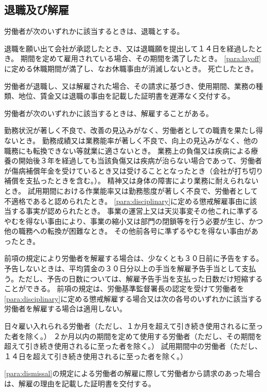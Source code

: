 \documentclass[10pt,a4paper]{jsarticle}
\begin{document}
\subsection{退職及び解雇}

労働者が次のいずれかに該当するときは、退職とする。
\begin{enumerate}
    \itm 退職を願い出て会社が承認したとき、又は退職願を提出して１４日を経過したとき。
    \itm 期間を定めて雇用されている場合、その期間を満了したとき。
    \itm \ref{para:layoff}に定める休職期間が満了し、なお休職事由が消滅しないとき。
    \itm 死亡したとき。
\end{enumerate}
\term
労働者が退職し、又は解雇された場合、その請求に基づき、使用期間、業務の種類、地位、賃金又は退職の事由を記載した証明書を遅滞なく交付する。

労働者が次のいずれかに該当するときは、解雇することがある。
\label{para:dismissal}
\begin{enumerate}
    \itm 勤務状況が著しく不良で、改善の見込みがなく、労働者としての職責を果たし得ないとき。
    \itm 勤務成績又は業務能率が著しく不良で、向上の見込みがなく、他の職務にも転換できない等就業に適さないとき。
    \itm 業務上の負傷又は疾病による療養の開始後３年を経過しても当該負傷又は疾病が治らない場合であって、労働者が傷病補償年金を受けているとき又は受けることとなったとき（会社が打ち切り補償を支払ったときを含む。）。
    \itm 精神又は身体の障害により業務に耐えられないとき。
    \itm 試用期間における作業能率又は勤務態度が著しく不良で、労働者として不適格であると認められたとき。
    \itm \ref{para:disciplinary}に定める懲戒解雇事由に該当する事実が認められたとき。
    \itm 事業の運営上又は天災事変その他これに準ずるやむを得ない事由により、事業の縮小又は部門の閉鎖等を行う必要が生じ、かつ他の職務への転換が困難なとき。
    \itm その他前各号に準ずるやむを得ない事由があったとき。
\end{enumerate}
\term
前項の規定により労働者を解雇する場合は、少なくとも３０日前に予告をする。予告しないときは、平均賃金の３０日分以上の手当を解雇予告手当として支払う。ただし、予告の日数については、解雇予告手当を支払った日数だけ短縮することができる。
\term
前項の規定は、労働基準監督署長の認定を受けて労働者を\ref{para:disciplinary}に定める懲戒解雇する場合又は次の各号のいずれかに該当する労働者を解雇する場合は適用しない。
\begin{enumerate}
    \itm 日々雇い入れられる労働者（ただし、１か月を超えて引き続き使用されるに至った者を除く。）
    \itm ２か月以内の期間を定めて使用する労働者（ただし、その期間を超えて引き続き使用されるに至った者を除く。）
    \itm 試用期間中の労働者（ただし、１４日を超えて引き続き使用されるに至った者を除く。）
\end{enumerate}
\term
\ref{para:dismissal}の規定による労働者の解雇に際して労働者から請求のあった場合は、解雇の理由を記載した証明書を交付する。
\end{document}
